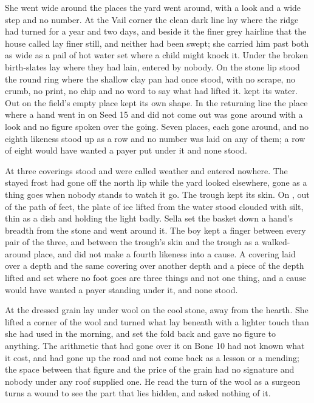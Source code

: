She went wide around the places the yard went around, with a look and a wide step and no number. At the Vail corner the clean dark line lay where the  ridge had turned for a year and two days, and beside it the finer grey hairline that the house called  lay finer still, and neither had been swept; she carried him past both as wide as a pail of hot water set where a child might knock it. Under  the broken birth-slates lay where they had lain, entered by nobody. On the stone lip stood the round ring where the shallow clay pan had once stood, with no scrape, no crumb, no print, no chip and no word to say what had lifted it.  kept its water. Out on  the field's empty place kept its own shape. In the returning line the place where a hand went in on Seed 15 and did not come out was gone around with a look and no figure spoken over the going. Seven places, each gone around, and no eighth likeness stood up as a row and no number was laid on any of them; a row of eight would have wanted a payer put under it and none stood.

At  three coverings stood and were called weather and entered nowhere. The stayed frost had gone off the north lip while the yard looked elsewhere, gone as a thing goes when nobody stands to watch it go. The trough kept its skin. On , out of the path of feet, the plate of ice lifted from the water stood clouded with silt, thin as a dish and holding the light badly. Sella set the basket down a hand's breadth from the stone and went around it. The boy kept a finger between every pair of the three, and between the trough's skin and the trough as a walked-around place, and did not make a fourth likeness into a cause. A covering laid over a depth and the same covering over another depth and a piece of the depth lifted and set where no foot goes are three things and not one thing, and a cause would have wanted a payer standing under it, and none stood.

At  the dressed grain lay under wool on the cool stone, away from the hearth. She lifted a corner of the wool and turned what lay beneath with a lighter touch than she had used in the morning, and set the fold back and gave no figure to anything. The arithmetic that had gone over it on Bone 10 had not known what it cost, and had gone up the road and not come back as a lesson or a mending; the space between that figure and the price of the grain had no signature and nobody under any roof supplied one. He read the turn of the wool as a surgeon turns a wound to see the part that lies hidden, and asked nothing of it.


